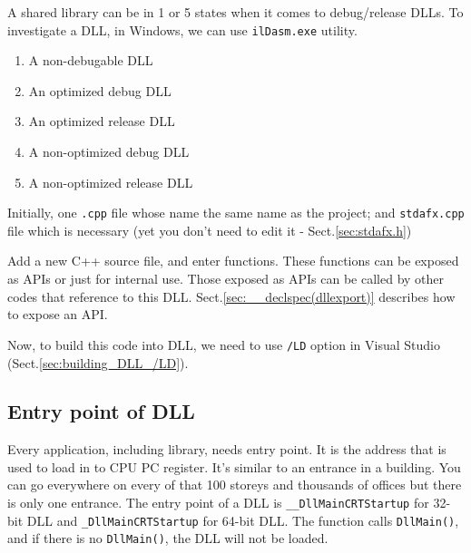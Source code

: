 \begin{mdframed}

A shared library can be in 1 or 5 states when it comes to debug/release DLLs.
To investigate a DLL, in Windows, we can use \verb!ilDasm.exe! utility.

\begin{enumerate}
  \item A non-debugable DLL
  \item An optimized debug DLL
  \item An optimized release DLL
  \item A non-optimized debug DLL
  \item A non-optimized release DLL
\end{enumerate}

\end{mdframed}


Initially, one \verb!.cpp! file whose name the same name as the project; and
\verb!stdafx.cpp! file which is necessary (yet you don't need to edit it - Sect.\ref{sec:stdafx.h})


Add a new C++ source file, and enter functions. These functions can be exposed
as APIs or just for internal use. Those exposed as APIs can be called by other
codes that reference to this DLL.
Sect.\ref{sec:__declspec(dllexport)} describes how to expose an API.

Now, to build this code into DLL, we need to use \verb!/LD! option in Visual Studio (Sect.\ref{sec:building_DLL_/LD}).

\subsection{Entry point of DLL}

Every application, including library, needs entry point. It is the address that
is used to load in to CPU PC register. It's similar to an entrance in a
building. You can go everywhere on every of that 100 storeys and thousands of
offices but there is only one entrance. The entry point of a DLL is
\verb!__DllMainCRTStartup! for 32-bit DLL and \verb!_DllMainCRTStartup! for
64-bit DLL. The function calls \verb!DllMain()!, and if there is no
\verb!DllMain()!, the DLL will not be loaded.



